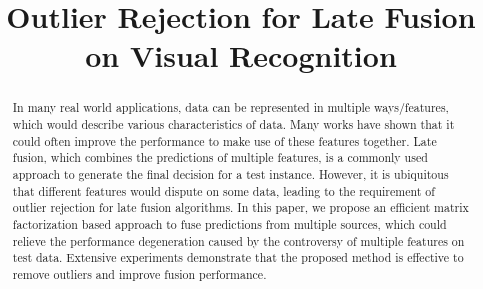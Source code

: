 \documentclass[letterpaper]{article}
\begin{document}
%



\title{Outlier Rejection for Late Fusion on Visual Recognition}


\maketitle



\begin{abstract}
In many real world applications, data can be represented in multiple ways/features, which would describe various characteristics of data.
Many works have shown that it could often improve the performance to make use of these features together.
Late fusion, which combines the predictions of multiple features, is a commonly used approach to generate the final decision for a test instance.
However, it is ubiquitous that different features would dispute on some data, leading to the requirement of outlier rejection for late fusion algorithms.
In this paper, we propose an efficient matrix factorization based approach to fuse predictions from multiple sources, which could
relieve the performance degeneration caused by the controversy of multiple features on test data.
Extensive experiments demonstrate that the proposed method is effective to remove outliers and improve fusion performance.

\end{abstract}
\end{document}
